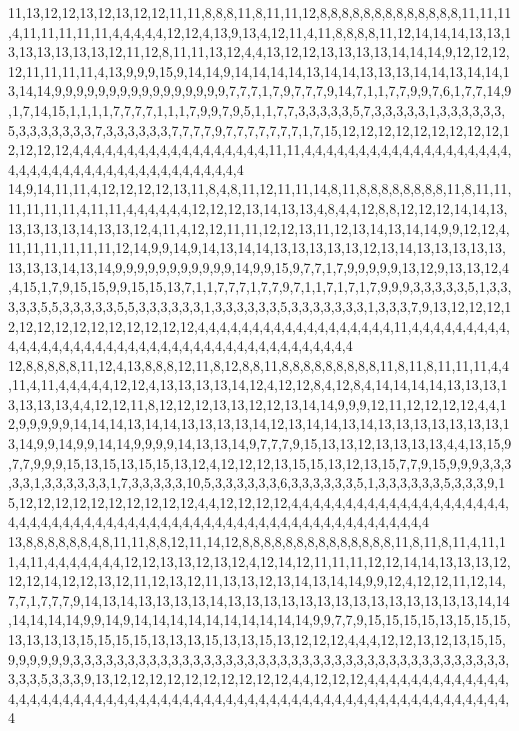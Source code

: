 11,13,12,12,13,12,13,12,12,11,11,8,8,8,11,8,11,11,12,8,8,8,8,8,8,8,8,8,8,8,8,8,11,11,11,4,11,11,11,11,11,4,4,4,4,4,12,12,4,13,9,13,4,12,11,4,11,8,8,8,8,11,12,14,14,14,13,13,13,13,13,13,13,13,12,11,12,8,11,11,13,12,4,4,13,12,12,13,13,13,13,14,14,14,9,12,12,12,12,11,11,11,11,4,13,9,9,9,15,9,14,14,9,14,14,14,14,13,14,14,13,13,13,14,14,13,14,14,13,14,14,9,9,9,9,9,9,9,9,9,9,9,9,9,9,9,9,7,7,7,1,7,9,7,7,7,9,14,7,1,1,7,7,9,9,7,6,1,7,7,14,9,1,7,14,15,1,1,1,1,7,7,7,7,1,1,1,7,9,9,7,9,5,1,1,7,7,3,3,3,3,3,5,7,3,3,3,3,3,1,3,3,3,3,3,3,5,3,3,3,3,3,3,3,7,3,3,3,3,3,3,7,7,7,7,9,7,7,7,7,7,7,7,1,7,15,12,12,12,12,12,12,12,12,12,12,12,12,12,4,4,4,4,4,4,4,4,4,4,4,4,4,4,4,4,4,4,11,11,4,4,4,4,4,4,4,4,4,4,4,4,4,4,4,4,4,4,4,4,4,4,4,4,4,4,4,4,4,4,4,4,4,4,4,4,4,4,4,4,4
14,9,14,11,11,4,12,12,12,12,13,11,8,4,8,11,12,11,11,14,8,11,8,8,8,8,8,8,8,8,11,8,11,11,11,11,11,11,4,11,11,4,4,4,4,4,4,12,12,12,13,14,13,13,4,8,4,4,12,8,8,12,12,12,14,14,13,13,13,13,13,14,13,13,12,4,11,4,12,12,11,11,12,12,13,11,12,13,14,13,14,14,9,9,12,12,4,11,11,11,11,11,11,12,14,9,9,14,9,14,13,14,14,13,13,13,13,13,12,13,14,13,13,13,13,13,13,13,13,14,13,14,9,9,9,9,9,9,9,9,9,9,9,14,9,9,15,9,7,7,1,7,9,9,9,9,9,13,12,9,13,13,12,4,4,15,1,7,9,15,15,9,9,15,15,13,7,1,1,7,7,7,1,7,7,9,7,1,1,7,1,7,1,7,9,9,9,3,3,3,3,3,5,1,3,3,3,3,3,5,5,3,3,3,3,3,5,5,3,3,3,3,3,3,1,3,3,3,3,3,3,5,3,3,3,3,3,3,3,1,3,3,3,7,9,13,12,12,12,12,12,12,12,12,12,12,12,12,12,12,4,4,4,4,4,4,4,4,4,4,4,4,4,4,4,4,4,4,11,4,4,4,4,4,4,4,4,4,4,4,4,4,4,4,4,4,4,4,4,4,4,4,4,4,4,4,4,4,4,4,4,4,4,4,4,4,4,4,4,4
12,8,8,8,8,8,11,12,4,13,8,8,8,12,11,8,12,8,8,11,8,8,8,8,8,8,8,8,8,11,8,11,8,11,11,11,4,4,11,4,11,4,4,4,4,4,12,12,4,13,13,13,13,14,12,4,12,12,8,4,12,8,4,14,14,14,14,13,13,13,13,13,13,13,4,4,12,12,11,8,12,12,12,13,13,12,12,13,14,14,9,9,9,12,11,12,12,12,12,4,4,12,9,9,9,9,9,14,14,14,13,14,14,13,13,13,13,14,12,13,14,14,13,14,13,13,13,13,13,13,13,13,14,9,9,14,9,9,14,14,9,9,9,9,14,13,13,14,9,7,7,7,9,15,13,13,12,13,13,13,13,4,4,13,15,9,7,7,9,9,9,15,13,15,13,15,15,13,12,4,12,12,12,13,15,15,13,12,13,15,7,7,9,15,9,9,9,3,3,3,3,3,1,3,3,3,3,3,3,1,7,3,3,3,3,3,10,5,3,3,3,3,3,3,6,3,3,3,3,3,3,5,1,3,3,3,3,3,3,5,3,3,3,9,15,12,12,12,12,12,12,12,12,12,12,4,4,12,12,12,12,4,4,4,4,4,4,4,4,4,4,4,4,4,4,4,4,4,4,4,4,4,4,4,4,4,4,4,4,4,4,4,4,4,4,4,4,4,4,4,4,4,4,4,4,4,4,4,4,4,4,4,4,4,4,4,4,4,4,4
13,8,8,8,8,8,8,4,8,11,11,8,8,12,11,14,12,8,8,8,8,8,8,8,8,8,8,8,8,8,8,11,8,11,8,11,4,11,11,4,11,4,4,4,4,4,4,4,12,12,13,13,12,13,12,4,12,14,12,11,11,11,12,12,14,14,13,13,13,12,12,12,14,12,12,13,12,11,12,13,12,11,13,13,12,13,14,13,14,14,9,9,12,4,12,12,11,12,14,7,7,1,7,7,7,9,14,13,14,13,13,13,13,14,13,13,13,13,13,13,13,13,13,13,13,13,13,13,14,14,14,14,14,14,9,9,14,9,14,14,14,14,14,14,14,14,14,14,9,9,7,7,9,15,15,15,15,13,15,15,15,13,13,13,13,15,15,15,15,13,13,13,15,13,13,15,13,12,12,12,4,4,4,12,12,13,12,13,15,15,9,9,9,9,9,9,3,3,3,3,3,3,3,3,3,3,3,3,3,3,3,3,3,3,3,3,3,3,3,3,3,3,3,3,3,3,3,3,3,3,3,3,3,3,3,3,3,3,3,5,3,3,3,9,13,12,12,12,12,12,12,12,12,12,12,4,4,12,12,12,4,4,4,4,4,4,4,4,4,4,4,4,4,4,4,4,4,4,4,4,4,4,4,4,4,4,4,4,4,4,4,4,4,4,4,4,4,4,4,4,4,4,4,4,4,4,4,4,4,4,4,4,4,4,4,4,4,4,4,4
